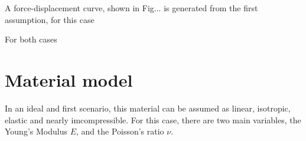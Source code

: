 A force-displacement curve, shown in Fig... is generated from the first assumption, 
for this case 

For both cases 
\section{Material model}

In an ideal and first scenario, this material can be assumed as linear, isotropic, 
elastic and nearly imcompressible. For this case, there are two main variables, the Young's
Modulus \(E\), and the Poisson's ratio $\nu$.

